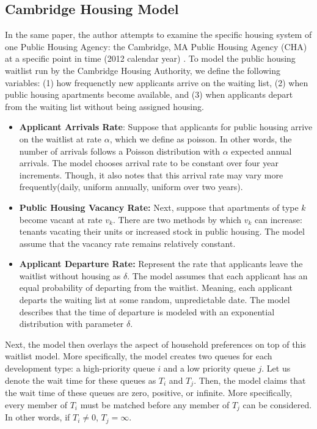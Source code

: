 \documentclass[11pt]{article}
\begin{document}
\subsection{Cambridge Housing Model}
\label{sec:chm}
In the same paper, the author attempts to examine the specific housing system of one Public Housing Agency: the Cambridge, MA Public Housing Agency (CHA) at a specific point in time (2012 calendar year) \cite{nyuaffordablehousing}. To model the public housing waitlist run by the Cambridge Housing Authority, we define the following variables: (1) how frequenctly new applicants arrive on the waiting list, (2) when public housing apartments become available, and (3) when applicants depart from the waiting list without being assigned housing. \\
\begin{itemize}
    \item \textbf{Applicant Arrivals Rate}: Suppose that applicants for public housing arrive on the waitlist at rate $\alpha$, which we define as poisson. In other words, the number of arrivals follows a Poisson distribution with $\alpha$ expected annual arrivals. The model chooses arrival rate to be constant over four year increments. Though, it also notes that this arrival rate may vary more frequently(daily, uniform annually, uniform over two years). 
    \item \textbf{Public Housing Vacancy Rate: } Next, suppose that apartments of type $k$ become vacant at rate $v_k$. There are two methods by which $v_k$ can increase: tenants vacating their units or increased stock in public housing. The model assume that the vacancy rate remains relatively constant.
    \item \textbf{Applicant Departure Rate: } Represent the rate that applicants leave the waitlist without housing as $\delta$. The model assumes that each applicant has an equal probability of departing from the waitlist. Meaning, each applicant departs the waiting list at some random, unpredictable date. The model describes that the time of departure is modeled with an exponential distribution with parameter $\delta$.
\end{itemize}
Next, the model then overlays the aspect of household preferences on top of this waitlist model. More specifically, the model creates two queues for each development type: a high-priority queue $i$ and a low priority queue $j$. Let us denote the wait time for these queues as $T_i$ and $T_j$. Then, the model claims that the wait time of these queues are zero, positive, or infinite. More specifically, every member of $T_i$ must be matched before any member of $T_j$ can be considered. In other words, if $T_i \neq 0$, $T_j = \infty$. 
\end{document}
